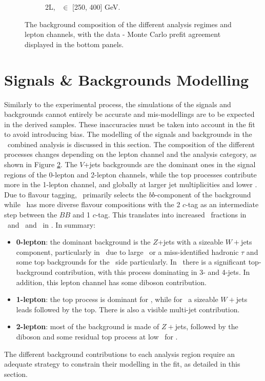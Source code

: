 \begin{figure}[h!]
{\begin{subfigure}[b]{0.37\textwidth}
            \caption{2L, \ptv\ $\in$ [250, 400] GeV.}
            \label{fig:backCom_2L_3}
        \end{subfigure} 
    }
    \caption{The background composition of the different analysis regimes and lepton channels, with the data - Monte Carlo prefit agreement displayed in the bottom panels.}
    \label{fig:backCom}
\end{figure} 

\section{Signals \& Backgrounds Modelling}\label{sec-mod}
Similarly to the experimental process, the simulations of the signals and backgrounds cannot entirely be accurate and mis-modellings are to be expected in the derived samples. These inaccuracies must be taken into account in the fit to avoid introducing bias. The modelling of the signals and backgrounds in the \vhbc\ combined analysis is discussed in this section. The composition of the different processes changes depending on the lepton channel and the analysis category, as shown in Figure \ref{fig:backCom}. The $V$+jets backgrounds are the dominant ones in the signal regions of the 0-lepton and 2-lepton channels, while the top processes contribute more in the 1-lepton channel, and globally at larger jet multiplicities and lower \ptv. Due to flavour tagging, \vhb\ primarily selects the $bb$-component of the background while \vhc\ has more diverse flavour compositions with the 2 $c$-tag as an intermediate step between the $BB$ and 1 $c$-tag. This translates into increased \vhf\ fractions in \vhb\ and \vmf\ and \vlf\ in \vhc. In summary:
\begin{itemize}
    \item \textbf{0-lepton}: the dominant background is the $Z$+jets with a sizeable $W+$jets component, particularly in \vhc\ due to large \etm\ or a miss-identified hadronic $\tau$ and some top backgrounds for the \vhb\ side particularly. In \vhb\ there is a significant top-background contribution, with this process dominating in 3- and 4-jets. In addition, this lepton channel has some diboson contribution.
    \item \textbf{1-lepton}: the top process is dominant for \vhb, while for \vhc\ a sizeable $W+$jets leads followed by the top. There is also a visible multi-jet contribution.  
    \item \textbf{2-lepton}: most of the background is made of $Z+$jets, followed by the diboson and some residual top process at low \ptv\ for \vhb. 
\end{itemize}
The different background contributions to each analysis region require an adequate strategy to constrain their modelling in the fit, as detailed in this section.
  
